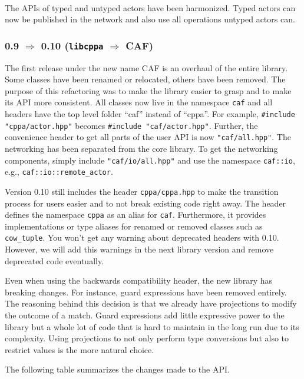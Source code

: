 ~

The APIs of typed and untyped actors have been harmonized.
Typed actors can now be published in the network and also use all operations untyped actors can.

\clearpage
\subsubsection{0.9 $\Rightarrow$ 0.10 (\texttt{libcppa} $\Rightarrow$ CAF)}

The first release under the new name CAF is an overhaul of the entire library.
Some classes have been renamed or relocated, others have been removed.
The purpose of this refactoring was to make the library easier to grasp and to make its API more consistent.
All classes now live in the namespace \lstinline^caf^ and all headers have the top level folder ``caf'' instead of ``cppa''.
For example, \lstinline^#include "cppa/actor.hpp"^ becomes \lstinline^#include "caf/actor.hpp"^.
Further, the convenience header to get all parts of the user API is now \lstinline^"caf/all.hpp"^.
The networking has been separated from the core library.
To get the networking components, simply include \lstinline^"caf/io/all.hpp"^ and use the namespace \lstinline^caf::io^, e.g., \lstinline^caf::io::remote_actor^.

Version 0.10 still includes the header \lstinline^cppa/cppa.hpp^ to make the transition process for users easier and to not break existing code right away.
The header defines the namespace \lstinline^cppa^ as an alias for \lstinline^caf^.
Furthermore, it provides implementations or type aliases for renamed or removed classes such as \lstinline^cow_tuple^.
You won't get any warning about deprecated headers with 0.10.
However, we will add this warnings in the next library version and remove deprecated code eventually.

Even when using the backwards compatibility header, the new library has breaking changes.
For instance, guard expressions have been removed entirely.
The reasoning behind this decision is that we already have projections to modify the outcome of a match.
Guard expressions add little expressive power to the library but a whole lot of code that is hard to maintain in the long run due to its complexity.
Using projections to not only perform type conversions but also to restrict values is the more natural choice.

The following table summarizes the changes made to the API.

